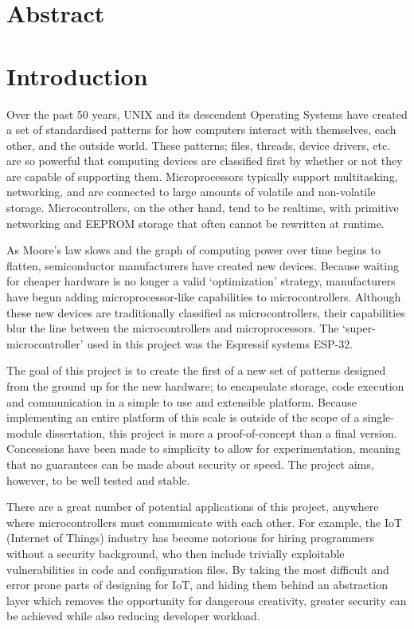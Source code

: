 \documentclass{article}
\begin{document}
\section{Abstract}

\tableofcontents
\section{Introduction}
Over the past 50 years, UNIX and its descendent Operating Systems have created a set of standardised patterns for how computers interact with themselves, each other, and the outside world.
These patterns; files, threads, device drivers, etc. are so powerful that computing devices are classified first by whether or not they are capable of supporting them.
Microprocessors typically support multitasking, networking, and are connected to large amounts of volatile and non-volatile storage.
Microcontrollers, on the other hand, tend to be realtime, with primitive networking and EEPROM storage that often cannot be rewritten at runtime.

As Moore's law slows and the graph of computing power over time begins to flatten, semiconductor manufacturers have created new devices.
Because waiting for cheaper hardware is no longer a valid \lq optimization' strategy, manufacturers have begun adding microprocessor-like capabilities to microcontrollers.
Although these new devices are traditionally classified as microcontrollers, their capabilities blur the line between the microcontrollers and microprocessors.
The \lq super-microcontroller' used in this project was the Espressif systems ESP-32.

The goal of this project is to create the first of a new set of patterns designed from the ground up for the new hardware; to encapsulate storage, code execution and communication in a simple to use and extensible platform.
Because implementing an entire platform of this scale is outside of the scope of a single-module dissertation, this project is more a proof-of-concept than a final version.
Concessions have been made to simplicity to allow for experimentation, meaning that no guarantees can be made about security or speed.
The project aims, however, to be well tested and stable.

There are a great number of potential applications of this project, anywhere where microcontrollers must communicate with each other. For example, the IoT (Internet of Things) industry has become notorious for hiring programmers without a security background, who then include trivially exploitable vulnerabilities in code and configuration files\cite{internetofsh}. By taking the most difficult and error prone parts of designing for IoT, and hiding them behind an abstraction layer which removes the opportunity for dangerous creativity, greater security can be achieved while also reducing developer workload.
\end{document}
